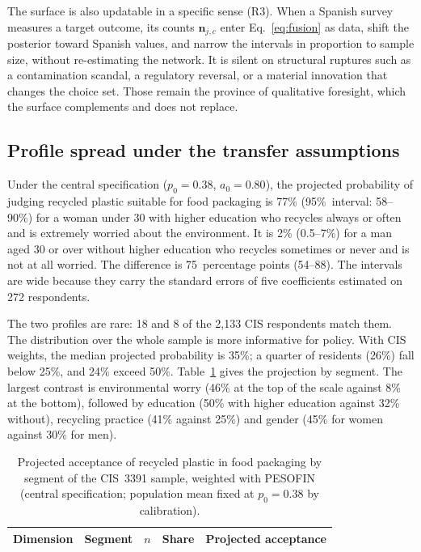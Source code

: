 The surface is also updatable in a specific sense (R3). When a Spanish survey
measures a target outcome, its counts $\mathbf{n}_{j,c}$ enter
Eq.~\eqref{eq:fusion} as data, shift the posterior toward Spanish values, and
narrow the intervals in proportion to sample size, without re-estimating the
network. It is silent on structural ruptures such as a contamination
scandal, a regulatory reversal, or a material innovation that changes the
choice set. Those remain the province of qualitative foresight, which the
surface complements and does not replace.

\subsection{Profile spread under the transfer assumptions}
\label{sec:spread}

Under the central specification ($p_0 = 0.38$, $a_0 = 0.80$), the projected
probability of judging recycled plastic suitable for food packaging is 77\%
(95\%~interval: 58--90\%) for a woman under 30 with higher education who
recycles always or often and is extremely worried about the environment. It is
2\% (0.5--7\%) for a man aged 30 or over without higher education who recycles
sometimes or never and is not at all worried. The difference is
75~percentage points (54--88). The intervals are wide because they carry the
standard errors of five coefficients estimated on 272 respondents.

The two profiles are rare: 18 and 8 of the 2{,}133 CIS respondents match them.
The distribution over the whole sample is more informative for policy. With
CIS weights, the median projected probability is 35\%; a quarter of residents
(26\%) fall below 25\%, and 24\% exceed 50\%. Table~\ref{tab:segments} gives
the projection by segment. The largest contrast is environmental worry (46\%
at the top of the scale against 8\% at the bottom), followed by education
(50\% with higher education against 32\% without), recycling practice (41\%
against 25\%) and gender (45\% for women against 30\% for men).

\begin{table}[htbp]
\centering
\caption{Projected acceptance of recycled plastic in food packaging by
segment of the CIS~3391 sample, weighted with PESOFIN (central specification;
population mean fixed at $p_0 = 0.38$ by calibration).}
\label{tab:segments}
\small
\begin{tabular}{llrrr}
\toprule
\textbf{Dimension} & \textbf{Segment} & $n$ & \textbf{Share} &
  \textbf{Projected acceptance} \\
\midrule
\bottomrule
\end{tabular}
\end{table}


